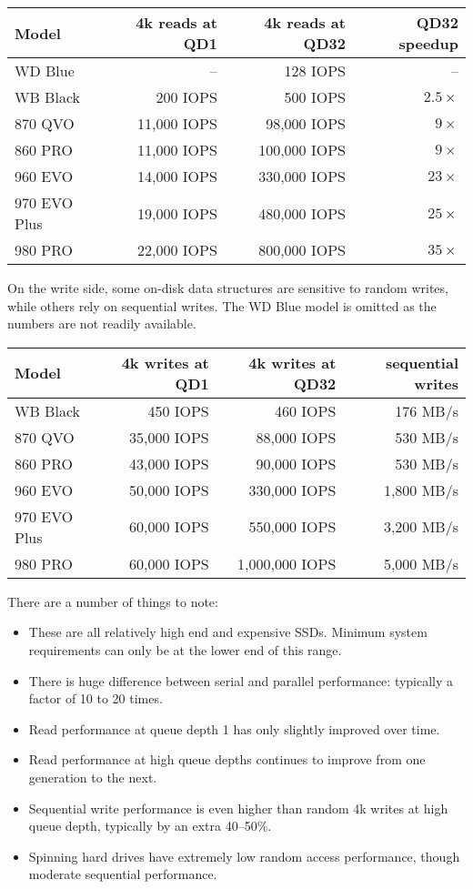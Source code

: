 \documentclass[11pt,a4paper]{article}
\begin{document}
\begin{center}
\begin{tabular}[]{lrrr}
  Model & 4k reads at QD1 & 4k reads at QD32 & QD32 speedup \\
  \toprule
  WD Blue      &    --       &     128 IOPS & -- \\
  WB Black     &    200 IOPS &     500 IOPS & $2.5\times$ \\
  \midrule
  870 QVO      & 11,000 IOPS &  98,000 IOPS & $9\times$ \\
  860 PRO      & 11,000 IOPS & 100,000 IOPS & $9\times$ \\
  960 EVO      & 14,000 IOPS & 330,000 IOPS & $23\times$ \\
  970 EVO Plus & 19,000 IOPS & 480,000 IOPS & $25\times$ \\
  980 PRO      & 22,000 IOPS & 800,000 IOPS & $35\times$
\end{tabular}
\end{center}
On the write side, some on-disk data structures are sensitive to random writes,
while others rely on sequential writes. The WD Blue model is omitted as the
numbers are not readily available.
\begin{center}
\begin{tabular}[]{lrrr}
  Model & 4k writes at QD1 & 4k writes at QD32 & sequential writes \\
  \toprule
  WB Black     &    450 IOPS &       460 IOPS &   176 MB/s \\
  \midrule
  870 QVO      & 35,000 IOPS &    88,000 IOPS &   530 MB/s \\
  860 PRO      & 43,000 IOPS &    90,000 IOPS &   530 MB/s \\
  960 EVO      & 50,000 IOPS &   330,000 IOPS & 1,800 MB/s \\
  970 EVO Plus & 60,000 IOPS &   550,000 IOPS & 3,200 MB/s \\
  980 PRO      & 60,000 IOPS & 1,000,000 IOPS & 5,000 MB/s
\end{tabular}
\end{center}
There are a number of things to note:
\begin{itemize}
\item These are all relatively high end and expensive SSDs. Minimum system
      requirements can only be at the lower end of this range.
\item There is huge difference between serial and parallel performance:
      typically a factor of 10 to 20 times.
\item Read performance at queue depth 1 has only slightly improved over time.
\item Read performance at high queue depths continues to improve from one
      generation to the next.
\item Sequential write performance is even higher than random 4k writes at
      high queue depth, typically by an extra 40--50\%.
\item Spinning hard drives have extremely low random access performance, though
      moderate sequential performance.
\end{itemize}
\end{document}
